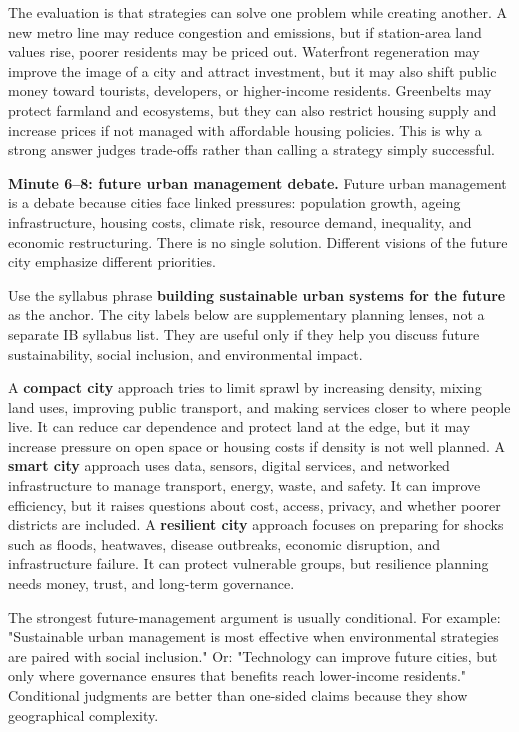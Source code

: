 \documentclass[11pt,a4paper]{article}
\newcommand{\term}[1]{\textcolor{HeadingBlue}{\textbf{#1}}}
\begin{document}
The evaluation is that strategies can solve one problem while creating another.
A new metro line may reduce congestion and emissions, but if station-area land
values rise, poorer residents may be priced out. Waterfront regeneration may
improve the image of a city and attract investment, but it may also shift public
money toward tourists, developers, or higher-income residents. Greenbelts may
protect farmland and ecosystems, but they can also restrict housing supply and
increase prices if not managed with affordable housing policies. This is why a
strong answer judges trade-offs rather than calling a strategy simply
successful.

\textbf{Minute 6--8: future urban management debate.}
Future urban management is a debate because cities face linked pressures:
population growth, ageing infrastructure, housing costs, climate risk, resource
demand, inequality, and economic restructuring. There is no single solution.
Different visions of the future city emphasize different priorities.

Use the syllabus phrase \term{building sustainable urban systems for the
future} as the anchor. The city labels below are supplementary planning lenses,
not a separate IB syllabus list. They are useful only if they help you discuss
future sustainability, social inclusion, and environmental impact.

A \term{compact city} approach tries to limit sprawl by increasing density,
mixing land uses, improving public transport, and making services closer to
where people live. It can reduce car dependence and protect land at the edge,
but it may increase pressure on open space or housing costs if density is not
well planned. A \term{smart city} approach uses data, sensors, digital services,
and networked infrastructure to manage transport, energy, waste, and safety. It
can improve efficiency, but it raises questions about cost, access, privacy,
and whether poorer districts are included. A \term{resilient city} approach
focuses on preparing for shocks such as floods, heatwaves, disease outbreaks,
economic disruption, and infrastructure failure. It can protect vulnerable
groups, but resilience planning needs money, trust, and long-term governance.

The strongest future-management argument is usually conditional. For example:
"Sustainable urban management is most effective when environmental strategies
are paired with social inclusion." Or: "Technology can improve future cities,
but only where governance ensures that benefits reach lower-income residents."
Conditional judgments are better than one-sided claims because they show
geographical complexity.
\end{document}
